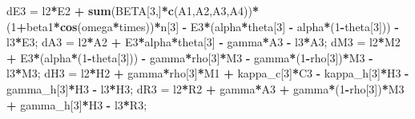 \documentclass[
]{article}
\newenvironment{Shaded}{\begin{snugshade}}{\end{snugshade}}
\newcommand{\DecValTok}[1]{\textcolor[rgb]{0.00,0.00,0.81}{#1}}
\newcommand{\KeywordTok}[1]{\textcolor[rgb]{0.13,0.29,0.53}{\textbf{#1}}}
\newcommand{\NormalTok}[1]{#1}
\newcommand{\OperatorTok}[1]{\textcolor[rgb]{0.81,0.36,0.00}{\textbf{#1}}}
\newcommand{\StringTok}[1]{\textcolor[rgb]{0.31,0.60,0.02}{#1}}
\begin{document}
\begin{Shaded}
\begin{Highlighting}[]
\NormalTok{    dE3 =}\StringTok{ }\NormalTok{l2}\OperatorTok{*}\NormalTok{E2 }\OperatorTok{+}\StringTok{ }\KeywordTok{sum}\NormalTok{(BETA[}\DecValTok{3}\NormalTok{,]}\OperatorTok{*}\KeywordTok{c}\NormalTok{(A1,A2,A3,A4))}\OperatorTok{*}\NormalTok{(}\DecValTok{1}\OperatorTok{+}\NormalTok{beta1}\OperatorTok{*}\KeywordTok{cos}\NormalTok{(omega}\OperatorTok{*}\NormalTok{times))}\OperatorTok{*}\NormalTok{n[}\DecValTok{3}\NormalTok{] }\OperatorTok{-}\StringTok{ }\NormalTok{E3}\OperatorTok{*}\NormalTok{(alpha}\OperatorTok{*}\NormalTok{theta[}\DecValTok{3}\NormalTok{] }\OperatorTok{-}\StringTok{ }\NormalTok{alpha}\OperatorTok{*}\NormalTok{(}\DecValTok{1}\OperatorTok{-}\NormalTok{theta[}\DecValTok{3}\NormalTok{])) }\OperatorTok{-}\StringTok{ }\NormalTok{l3}\OperatorTok{*}\NormalTok{E3;}
\NormalTok{    dA3 =}\StringTok{ }\NormalTok{l2}\OperatorTok{*}\NormalTok{A2 }\OperatorTok{+}\StringTok{ }\NormalTok{E3}\OperatorTok{*}\NormalTok{alpha}\OperatorTok{*}\NormalTok{theta[}\DecValTok{3}\NormalTok{] }\OperatorTok{-}\StringTok{ }\NormalTok{gamma}\OperatorTok{*}\NormalTok{A3 }\OperatorTok{-}\StringTok{ }\NormalTok{l3}\OperatorTok{*}\NormalTok{A3;}
\NormalTok{    dM3 =}\StringTok{ }\NormalTok{l2}\OperatorTok{*}\NormalTok{M2 }\OperatorTok{+}\StringTok{ }\NormalTok{E3}\OperatorTok{*}\NormalTok{(alpha}\OperatorTok{*}\NormalTok{(}\DecValTok{1}\OperatorTok{-}\NormalTok{theta[}\DecValTok{3}\NormalTok{])) }\OperatorTok{-}\StringTok{ }\NormalTok{gamma}\OperatorTok{*}\NormalTok{rho[}\DecValTok{3}\NormalTok{]}\OperatorTok{*}\NormalTok{M3 }\OperatorTok{-}\StringTok{ }\NormalTok{gamma}\OperatorTok{*}\NormalTok{(}\DecValTok{1}\OperatorTok{-}\NormalTok{rho[}\DecValTok{3}\NormalTok{])}\OperatorTok{*}\NormalTok{M3 }\OperatorTok{-}\StringTok{ }\NormalTok{l3}\OperatorTok{*}\NormalTok{M3;}
\NormalTok{    dH3 =}\StringTok{ }\NormalTok{l2}\OperatorTok{*}\NormalTok{H2 }\OperatorTok{+}\StringTok{ }\NormalTok{gamma}\OperatorTok{*}\NormalTok{rho[}\DecValTok{3}\NormalTok{]}\OperatorTok{*}\NormalTok{M1 }\OperatorTok{+}\StringTok{ }\NormalTok{kappa_c[}\DecValTok{3}\NormalTok{]}\OperatorTok{*}\NormalTok{C3 }\OperatorTok{-}\StringTok{ }\NormalTok{kappa_h[}\DecValTok{3}\NormalTok{]}\OperatorTok{*}\NormalTok{H3 }\OperatorTok{-}\StringTok{ }\NormalTok{gamma_h[}\DecValTok{3}\NormalTok{]}\OperatorTok{*}\NormalTok{H3 }\OperatorTok{-}\StringTok{ }\NormalTok{l3}\OperatorTok{*}\NormalTok{H3;}
\NormalTok{    dR3 =}\StringTok{ }\NormalTok{l2}\OperatorTok{*}\NormalTok{R2 }\OperatorTok{+}\StringTok{ }\NormalTok{gamma}\OperatorTok{*}\NormalTok{A3 }\OperatorTok{+}\StringTok{ }\NormalTok{gamma}\OperatorTok{*}\NormalTok{(}\DecValTok{1}\OperatorTok{-}\NormalTok{rho[}\DecValTok{3}\NormalTok{])}\OperatorTok{*}\NormalTok{M3 }\OperatorTok{+}\StringTok{ }\NormalTok{gamma_h[}\DecValTok{3}\NormalTok{]}\OperatorTok{*}\NormalTok{H3 }\OperatorTok{-}\StringTok{ }\NormalTok{l3}\OperatorTok{*}\NormalTok{R3;}

\end{Highlighting}
\end{Shaded}
\end{document}

